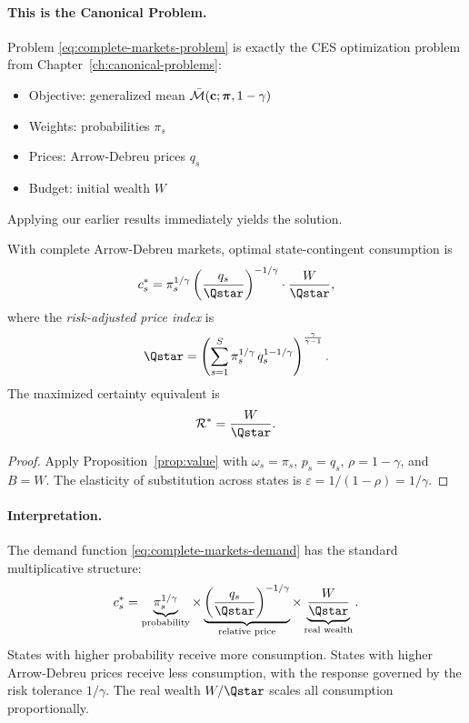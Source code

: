 \paragraph{This is the Canonical Problem.}

Problem \eqref{eq:complete-markets-problem} is exactly the CES optimization problem from Chapter~\ref{ch:canonical-problems}:
\begin{itemize}[nosep]
    \item Objective: generalized mean $\bar{\mathcal{M}}(\mathbf{c}; \bm{\pi}, 1-\gamma)$
    \item Weights: probabilities $\pi_s$
    \item Prices: Arrow-Debreu prices $q_s$
    \item Budget: initial wealth $W$
\end{itemize}

Applying our earlier results immediately yields the solution.

\begin{proposition}
\label{prop:complete-markets}
With complete Arrow-Debreu markets, optimal state-contingent consumption is
\begin{equation}
c_s\opt = \pi_s^{1/\gamma} \left( \frac{q_s}{\Qstar} \right)^{-1/\gamma} \cdot \frac{W}{\Qstar},
\label{eq:complete-markets-demand}
\end{equation}
where the \emph{risk-adjusted price index} is
\begin{equation}
\Qstar = \left( \sum_{s=1}^{S} \pi_s^{1/\gamma} \, q_s^{1-1/\gamma} \right)^{\frac{\gamma}{\gamma-1}}.
\label{eq:risk-price-index}
\end{equation}
The maximized certainty equivalent is
\begin{equation}
\CE\opt = \frac{W}{\Qstar}.
\label{eq:ce-value}
\end{equation}
\end{proposition}

\begin{proof}
Apply Proposition~\ref{prop:value} with $\omega_s = \pi_s$, $p_s = q_s$, $\rho = 1 - \gamma$, and $B = W$. The elasticity of substitution across states is $\varepsilon = 1/(1 - \rho) = 1/\gamma$.
\end{proof}

\paragraph{Interpretation.}

The demand function \eqref{eq:complete-markets-demand} has the standard multiplicative structure:
\[
c_s\opt = \underbrace{\pi_s^{1/\gamma}}_{\text{probability}} \times \underbrace{\left( \frac{q_s}{\Qstar} \right)^{-1/\gamma}}_{\text{relative price}} \times \underbrace{\frac{W}{\Qstar}}_{\text{real wealth}}.
\]
States with higher probability receive more consumption. States with higher Arrow-Debreu prices receive less consumption, with the response governed by the risk tolerance $1/\gamma$. The real wealth $W/\Qstar$ scales all consumption proportionally.

